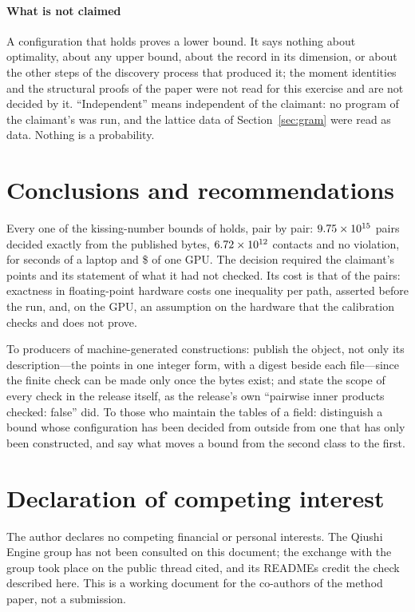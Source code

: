 \documentclass[preprint,11pt,authoryear,a4paper]{elsarticle}
\begin{document}
\paragraph{What is not claimed} A configuration that holds proves a lower bound. It says nothing about optimality, about any upper bound, about the record in its dimension, or about the other steps of the discovery process that produced it; the moment identities and the structural proofs of the paper were not read for this exercise and are not decided by it. ``Independent'' means independent of the claimant: no program of the claimant's was run, and the lattice data of Section~\ref{sec:gram} were read as data. Nothing is a probability.

\section{Conclusions and recommendations}\label{sec:conclusions}

Every one of the \MtKwRows{} kissing-number bounds of \citet{Yang26} holds, pair by pair: $9.75 \times 10^{15}$ pairs decided exactly from the published bytes, $6.72 \times 10^{12}$ contacts and no violation, for \MtKwDeskSeconds{} seconds of a laptop and \$\MtKwGpuCost{} of one GPU. The decision required the claimant's points and its statement of what it had not checked. Its cost is that of the pairs: exactness in floating-point hardware costs one inequality per path, asserted before the run, and, on the GPU, an assumption on the hardware that the calibration checks and does not prove.

To producers of machine-generated constructions: publish the object, not only its description---the points in one integer form, with a digest beside each file---since the finite check can be made only once the bytes exist; and state the scope of every check in the release itself, as the release's own ``pairwise inner products checked: false'' did. To those who maintain the tables of a field: distinguish a bound whose configuration has been decided from outside from one that has only been constructed, and say what moves a bound from the second class to the first.

\section*{Declaration of competing interest}
The author declares no competing financial or personal interests. The Qiushi Engine group has not been consulted on this document; the exchange with the group took place on the public thread cited, and its READMEs credit the check described here. This is a working document for the co-authors of the method paper, not a submission.
\end{document}

